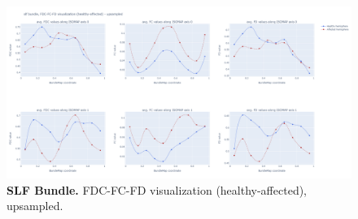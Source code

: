 \documentclass[thesis.tex]{subfiles}
\begin{document}
\begin{figure}
    \centering
  \includegraphics[width=24cm]{thesis_radomskyi/images/slf bundle, FDC-FC-FD visualization (healthy-affected) - upsampled.png}
    \caption{\textbf{SLF Bundle.} FDC-FC-FD visualization (healthy-affected), upsampled.}
    \label{fig:slf-bundle-fdc-fc-fd}
\end{figure}
\end{document}
